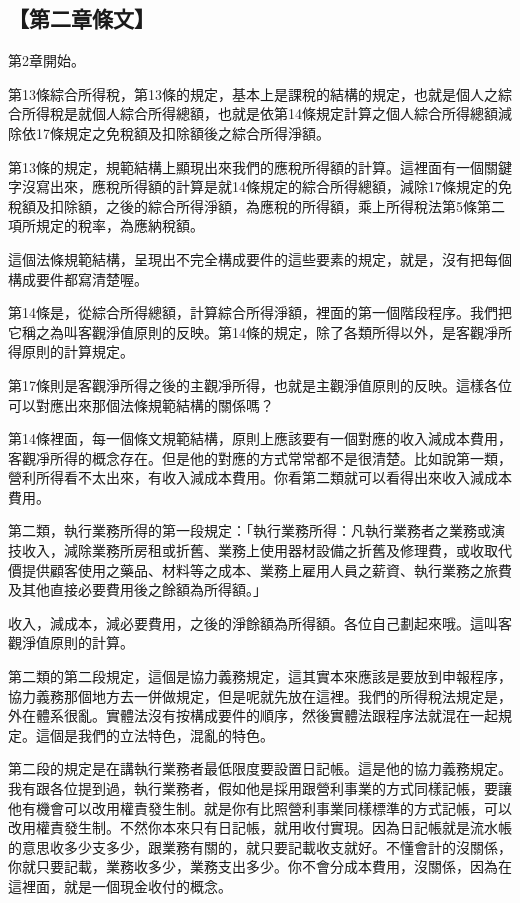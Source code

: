 \documentclass[]{ctexbook}
\begin{document}
\hypertarget{ux7b2cux4e8cux7ae0ux689dux6587}{%
\subsection{【第二章條文】}\label{ux7b2cux4e8cux7ae0ux689dux6587}}

第2章開始。

第13條綜合所得稅，第13條的規定，基本上是課稅的結構的規定，也就是個人之綜合所得稅是就個人綜合所得總額，也就是依第14條規定計算之個人綜合所得總額減除依17條規定之免稅額及扣除額後之綜合所得淨額。

第13條的規定，規範結構上顯現出來我們的應稅所得額的計算。這裡面有一個關鍵字沒寫出來，應稅所得額的計算是就14條規定的綜合所得總額，減除17條規定的免稅額及扣除額，之後的綜合所得淨額，為應稅的所得額，乘上所得稅法第5條第二項所規定的稅率，為應納稅額。

這個法條規範結構，呈現出不完全構成要件的這些要素的規定，就是，沒有把每個構成要件都寫清楚喔。

第14條是，從綜合所得總額，計算綜合所得淨額，裡面的第一個階段程序。我們把它稱之為叫客觀淨值原則的反映。第14條的規定，除了各類所得以外，是客觀凈所得原則的計算規定。

第17條則是客觀淨所得之後的主觀凈所得，也就是主觀淨值原則的反映。這樣各位可以對應出來那個法條規範結構的關係嗎？

第14條裡面，每一個條文規範結構，原則上應該要有一個對應的收入減成本費用，客觀凈所得的概念存在。但是他的對應的方式常常都不是很清楚。比如說第一類，營利所得看不太出來，有收入減成本費用。你看第二類就可以看得出來收入減成本費用。

第二類，執行業務所得的第一段規定：「執行業務所得：凡執行業務者之業務或演技收入，減除業務所房租或折舊、業務上使用器材設備之折舊及修理費，或收取代價提供顧客使用之藥品、材料等之成本、業務上雇用人員之薪資、執行業務之旅費及其他直接必要費用後之餘額為所得額。」

收入，減成本，減必要費用，之後的淨餘額為所得額。各位自己劃起來哦。這叫客觀淨值原則的計算。

第二類的第二段規定，這個是協力義務規定，這其實本來應該是要放到申報程序，協力義務那個地方去一併做規定，但是呢就先放在這裡。我們的所得稅法規定是，外在體系很亂。實體法沒有按構成要件的順序，然後實體法跟程序法就混在一起規定。這個是我們的立法特色，混亂的特色。

第二段的規定是在講執行業務者最低限度要設置日記帳。這是他的協力義務規定。我有跟各位提到過，執行業務者，假如他是採用跟營利事業的方式同樣記帳，要讓他有機會可以改用權責發生制。就是你有比照營利事業同樣標準的方式記帳，可以改用權責發生制。不然你本來只有日記帳，就用收付實現。因為日記帳就是流水帳的意思收多少支多少，跟業務有關的，就只要記載收支就好。不懂會計的沒關係，你就只要記載，業務收多少，業務支出多少。你不會分成本費用，沒關係，因為在這裡面，就是一個現金收付的概念。
\end{document}
